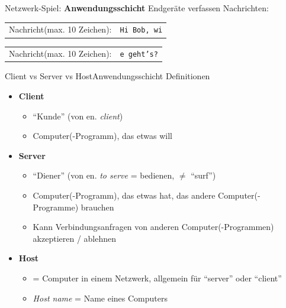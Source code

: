 \begin{frame}{Netzwerk-Spiel: \textbf{Anwendungsschicht}}
    Endgeräte verfassen Nachrichten:
    \begin{table}[H]
        \centering
        \begin{tabular}{p{2cm}l}
            \rowcolor{\applicationLayerColor!20}Nachricht\newline\tiny (max. 10 Zeichen): & \texttt{Hi Bob, wi} \\
        \end{tabular}
        \begin{tabular}{p{2cm}l}
            \rowcolor{\applicationLayerColor!20}Nachricht\newline\tiny (max. 10 Zeichen): & \texttt{e geht's?} \\
        \end{tabular}
    \end{table}
\end{frame}


\begin{frame}[fragile]{\faLaptop{} Client vs Server vs Host}{Anwendungsschicht}
    Definitionen
    \begin{itemize}[<+->]
        \item \textbf{Client}
              \begin{itemize}
                  \item \enquote{Kunde} (von en. \textit{client})
                  \item Computer(-Programm), das etwas will
              \end{itemize}
        \item \textbf{Server}
              \begin{itemize}
                  \item \enquote{Diener} (von en. \textit{to serve} = bedienen, $\neq$ \enquote{surf})
                  \item Computer(-Programm), das etwas hat, das andere Computer(-Programme) brauchen
                  \item Kann Verbindungsanfragen von anderen Computer(-Programmen) akzeptieren / ablehnen
              \end{itemize}
        \item \textbf{Host}
              \begin{itemize}
                  \item = Computer in einem Netzwerk, allgemein für \enquote{server} oder \enquote{client}
                  \item \textit{Host name} = Name eines Computers
              \end{itemize}

    \end{itemize}
\end{frame}

